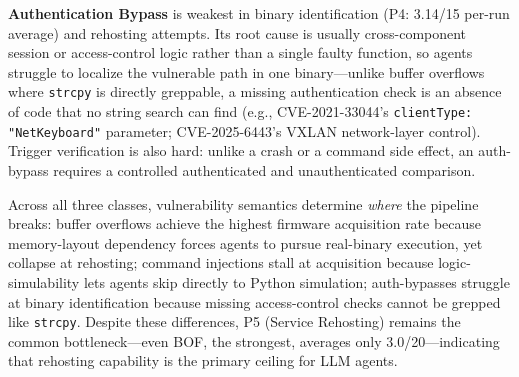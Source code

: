 \noindent\textbf{Authentication Bypass} is weakest in binary identification (P4: 3.14/15 per-run average) and rehosting attempts. Its root cause is usually cross-component session or access-control logic rather than a single faulty function, so agents struggle to localize the vulnerable path in one binary---unlike buffer overflows where \texttt{strcpy} is directly greppable, a missing authentication check is an absence of code that no string search can find (e.g., CVE-2021-33044's \texttt{clientType: "NetKeyboard"} parameter; CVE-2025-6443's VXLAN network-layer control). Trigger verification is also hard: unlike a crash or a command side effect, an auth-bypass requires a controlled authenticated and unauthenticated comparison. 

Across all three classes, vulnerability semantics determine \emph{where} the pipeline breaks: buffer overflows achieve the highest firmware acquisition rate because memory-layout dependency forces agents to pursue real-binary execution, yet collapse at rehosting; command injections stall at acquisition because logic-simulability lets agents skip directly to Python simulation; auth-bypasses struggle at binary identification because missing access-control checks cannot be grepped like \texttt{strcpy}. Despite these differences, P5 (Service Rehosting) remains the common bottleneck---even BOF, the strongest, averages only 3.0/20---indicating that rehosting capability is the primary ceiling for LLM agents.


